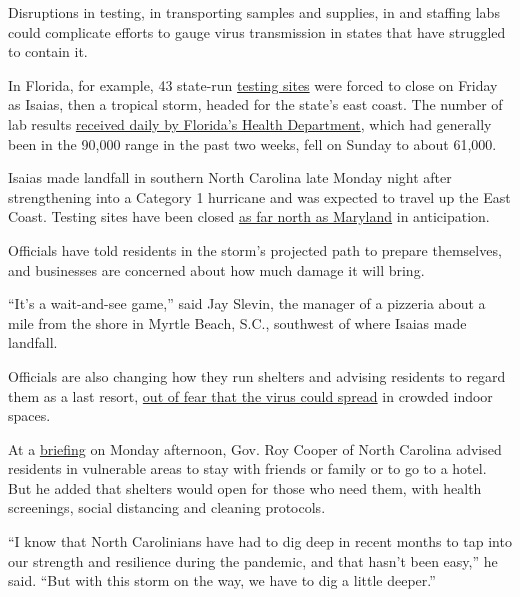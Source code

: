 Disruptions in testing, in transporting samples and supplies, in and
staffing labs could complicate efforts to gauge virus transmission in
states that have struggled to contain it.

In Florida, for example, 43 state-run
\href{https://floridadisaster.org/covid19/testing-sites/}{testing sites}
were forced to close on Friday as Isaias, then a tropical storm, headed
for the state's east coast. The number of lab results
\href{http://ww11.doh.state.fl.us/comm/_partners/covid19_report_archive/state_reports_latest.pdf}{received
daily by Florida's Health Department}, which had generally been in the
90,000 range in the past two weeks, fell on Sunday to about 61,000.

Isaias made landfall in southern North Carolina late Monday night after
strengthening into a Category 1 hurricane and was expected to travel up
the East Coast. Testing sites have been closed
\href{https://patch.com/maryland/baltimore/tropical-storm-isaias-closes-14-md-coronavirus-testing-sites}{as
far north as Maryland} in anticipation.

Officials have told residents in the storm's projected path to prepare
themselves, and businesses are concerned about how much damage it will
bring.

``It's a wait-and-see game,'' said Jay Slevin, the manager of a pizzeria
about a mile from the shore in Myrtle Beach, S.C., southwest of where
Isaias made landfall.

Officials are also changing how they run shelters and advising residents
to regard them as a last resort,
\href{https://www.nytimes.com/2020/07/26/us/virus-texas-storm.html}{out
of fear that the virus could spread} in crowded indoor spaces.

At a
\href{https://www.ncdps.gov/storm-update?fbclid=IwAR3gtINKPXqQdsJixuf1kwBKbAtEMz62wzyoDHlu7FDBN1HTarDlw8FlVwQ}{briefing}
on Monday afternoon, Gov. Roy Cooper of North Carolina advised residents
in vulnerable areas to stay with friends or family or to go to a hotel.
But he added that shelters would open for those who need them, with
health screenings, social distancing and cleaning protocols.

``I know that North Carolinians have had to dig deep in recent months to
tap into our strength and resilience during the pandemic, and that
hasn't been easy,'' he said. ``But with this storm on the way, we have
to dig a little deeper.''

\hypertarget{-5}{%
\subsection{}\label{-5}}

